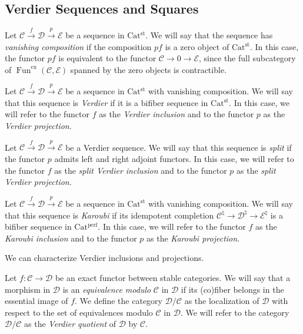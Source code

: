 \documentclass[a4paper,dvipdfmx,11pt,reqno]{amsart}
\DeclareMathOperator{\Fun}{Fun}
\newcommand{\C}{\mathcal{C}}
\newcommand{\D}{\mathcal{D}}
\newcommand{\E}{\mathcal{E}}
\newcommand{\Catperf}{\mathrm{Cat^{perf}}}
\newcommand{\Catst}{\mathrm{Cat^{st}}}
\begin{document}
\subsection{Verdier Sequences and Squares}

\begin{definition} %
  Let $\C \xrightarrow{f} \D \xrightarrow{p} \E$ be a sequence in $\Catst$.
  We will say that the sequence has \textit{vanishing composition} if the composition $pf$ is a zero object of $\Catst$.
  In this case, the functor $pf$ is equivalent to the functor $\C \to 0 \to \E$, since the full subcategory of $\Fun^{\mathrm{ex}}(\C,\E)$ spanned by the zero objects is contractible.
\end{definition}

\begin{definition} %
  Let $\C \xrightarrow{f} \D \xrightarrow{p} \E$ be a sequence in $\Catst$ with vanishing composition.
  We will say that this sequence is \textit{Verdier} if it is a bifiber sequence in $\Catst$.
  In this case, we will refer to the functor $f$ as the \textit{Verdier inclusion} and to the functor $p$ as the \textit{Verdier projection}.
\end{definition}

\begin{definition}
  Let $\C \xrightarrow{f} \D \xrightarrow{p} \E$ be a Verdier sequence.
  We will say that this sequence is \textit{split} if the functor $p$ admits left and right adjoint functors.
  In this case, we will refer to the functor $f$ as the \textit{split Verdier inclusion} and to the functor $p$ as the \textit{split Verdier projection}.
\end{definition}

\begin{definition}
  Let $\C \xrightarrow{f} \D \xrightarrow{p} \E$ be a sequence in $\Catst$ with vanishing composition.
  We will say that this sequence is \textit{Karoubi} if its idempotent completion $\C^{\natural} \to \D^{\natural} \to \E^{\natural}$ is a bifiber sequence in $\Catperf$.
  In this case, we will refer to the functor $f$ as the \textit{Karoubi inclusion} and to the functor $p$ as the \textit{Karoubi projection}.
\end{definition}

We can characterize Verdier inclusions and projections.

\begin{definition}
  Let $f : \C \to \D$ be an exact functor between stable categories.
  We will say that a morphism in $\D$ is an \textit{equivalence modulo} $\C$ in $\D$ if its (co)fiber belongs in the essential image of $f$.
  We define the category $\D/\C$ as the localization of $\D$ with respect to the set of equivalences modulo $\C$ in $\D$.
  We will refer to the category $\D/\C$ as the \textit{Verdier quotient} of $\D$ by $\C$.
\end{definition}
\end{document}
